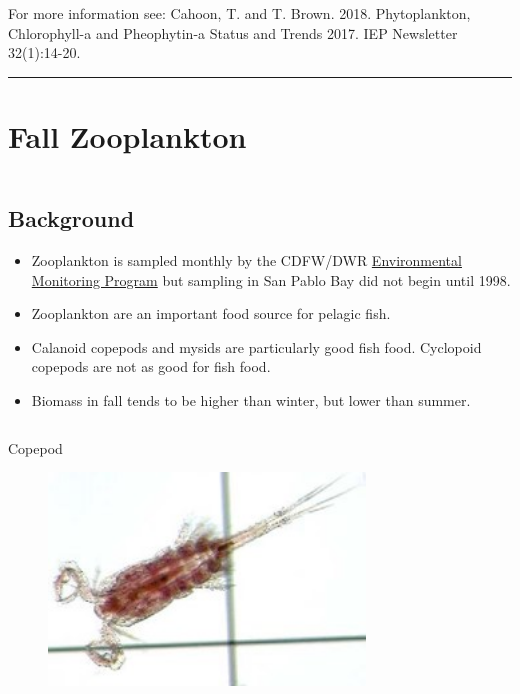 \documentclass[
]{book}
\providecommand{\tightlist}{%
  \setlength{\itemsep}{0pt}\setlength{\parskip}{0pt}}
\begin{document}
\begin{disclaimer}
For more information see: Cahoon, T. and T. Brown. 2018. Phytoplankton,
Chlorophyll-a and Pheophytin-a Status and Trends 2017. IEP Newsletter
32(1):14-20.
\end{disclaimer}

\begin{center}\rule{0.5\linewidth}{0.5pt}\end{center}

\hypertarget{fall-zooplankton}{%
\section{Fall Zooplankton}\label{fall-zooplankton}}

\begin{columns-nocenter}

\begin{column}

\hypertarget{background-3}{%
\subsection{Background}\label{background-3}}

\begin{itemize}
\tightlist
\item
  Zooplankton is sampled monthly by the CDFW/DWR \href{https://emp.baydeltalive.com/wiki/12297}{Environmental Monitoring Program} but sampling in San Pablo Bay did not begin until 1998.
\item
  Zooplankton are an important food source for pelagic fish.
\item
  Calanoid copepods and mysids are particularly good fish food. Cyclopoid copepods are not as good for fish food.
\item
  Biomass in fall tends to be higher than winter, but lower than summer.
\end{itemize}

\end{column}

\begin{column}

Copepod

\begin{figure}

{\centering \includegraphics[width=3.31in]{figures/copepod} 

}
\end{figure}
\end{column}
\end{columns-nocenter}
\end{document}
